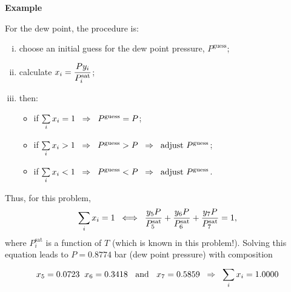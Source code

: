 \begin{MyExample}{\begin{center}{\bf Example}\end{center}}
     For the dew point, the procedure is:
    \begin{enumerate}[i)]
       \item choose an initial guess for the dew point pressure, $P^{\text{guess}}$;
       \item calculate $x_{i}=\frc{Py_{i}}{P_{i}^{\text{sat}}}$;
       \item then:
           \begin{itemize}
              \item if $\summation[x_{i}]{i}{} = 1 \;\;\Rightarrow \;\; P^{\text{guess}} = P$;
              \item if $\summation[x_{i}]{i}{} > 1 \;\;\Rightarrow \;\; P^{\text{guess}} > P \;\; \Rightarrow\;\; \text{adjust } P^{\text{guess}}$;
              \item if $\summation[x_{i}]{i}{} < 1 \;\;\Rightarrow \;\; P^{\text{guess}} < P \;\; \Rightarrow\;\; \text{adjust } P^{\text{guess}}$.
           \end{itemize}
    \end{enumerate}
    Thus, for this problem,
    \begin{displaymath}
        \summation[x_{i}]{i}{} = 1\;\; \Longleftrightarrow \;\; \frc{y_{5}P}{P_{5}^{\text{sat}}} + \frc{y_{6}P}{P_{6}^{\text{sat}}} + \frc{y_{7}P}{P_{7}^{\text{sat}}} = 1,
    \end{displaymath}
    where $P_{i}^{\text{sat}}$ is a function of $T$ (which is known in this problem!).  Solving this equation leads to $P=0.8774$ bar (dew point pressure) with composition
    \begin{displaymath}
        x_{5} =0.0723\;\; x_{6} = 0.3418\;\;\text{ and }\;\;x_{7} = 0.5859\;\;\Rightarrow\;\; \summation[x_{i}]{i}{} = 1.0000
    \end{displaymath}
   \end{MyExample}

